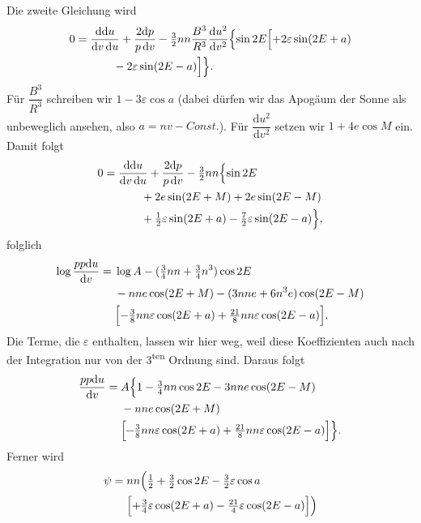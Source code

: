 \clearpage
\begingroup
{}
\renewcommand{\headrulewidth}{0pt}
\par\noindent\hspace*{\parindent}Die zweite Gleichung wird
\[
\begin{aligned}
0={}&\frac{\mathrm{dd}u}{\mathrm{d}v\,\mathrm{d}u}
+\frac{2\mathrm{d}p}{p\,\mathrm{d}v}
-\tfrac32nn\frac{B^3}{R^3}\frac{\mathrm{d}u^2}{\mathrm{d}v^2}\Bigl\{\sin2E\Bigl[+2\varepsilon\sin(2E+a)\\
&\qquad-2\varepsilon\sin(2E-a)\Bigr]\Bigr\}.
\end{aligned}
\]
\noindent Für \(\dfrac{B^3}{R^3}\) schreiben wir \(1-3\varepsilon\cos a\)
(dabei dürfen wir das Apogäum der Sonne als unbeweglich ansehen, also
\(a=nv-\mathit{Const.}\)). Für \(\dfrac{\mathrm{d}u^2}{\mathrm{d}v^2}\)
setzen wir \(1+4e\cos M\) ein. Damit folgt
\[
\begin{aligned}
0={}&\frac{\mathrm{dd}u}{\mathrm{d}v\,\mathrm{d}u}
+\frac{2\mathrm{d}p}{p\,\mathrm{d}v}-\tfrac32nn\Bigl\{\sin2E\\
&\qquad+2e\sin(2E+M)+2e\sin(2E-M)\\
&\qquad+\tfrac12\varepsilon\sin(2E+a)-\tfrac72\varepsilon\sin(2E-a)\Bigr\},
\end{aligned}
\]
\noindent folglich
\[
\begin{aligned}
\log\frac{pp\mathrm{d}u}{\mathrm{d}v}={}&\log A-(\tfrac34nn+\tfrac34n^3)\cos2E\\
&-nne\cos(2E+M)-(3nne+6n^3e)\cos(2E-M)\\
&\Bigl[-\tfrac38nn\varepsilon\cos(2E+a)
+\tfrac{21}{8}nn\varepsilon\cos(2E-a)\Bigr].
\end{aligned}
\]
\noindent Die Terme, die \(\varepsilon\) enthalten, lassen wir hier weg, weil diese
Koeffizienten auch nach der Integration nur von der 3\textsuperscript{ten} Ordnung sind.
Daraus folgt
\[
\begin{aligned}
\frac{pp\mathrm{d}u}{\mathrm{d}v}={}&A\Bigl\{1-\tfrac34nn\cos2E-3nne\cos(2E-M)\\
&-nne\cos(2E+M)\\
&\Bigl[\mathbin{\vcenter{\hbox{\rule{.33em}{.04em}\kern.025em\rule{.33em}{.04em}}}}
\tfrac38nn\varepsilon\cos(2E+a)
+\tfrac{21}{8}nn\varepsilon\cos(2E-a)\Bigr]\Bigr\}.
\end{aligned}
\]
\noindent Ferner wird
\[
\begin{aligned}
\psi={}&nn\Bigl(\tfrac12+\tfrac32\cos2E-\tfrac32\varepsilon\cos a\\
&\Bigl[+\tfrac34\varepsilon\cos(2E+a)-\tfrac{21}{4}\varepsilon\cos(2E-a)\Bigr]\Bigr)
\end{aligned}
\]
